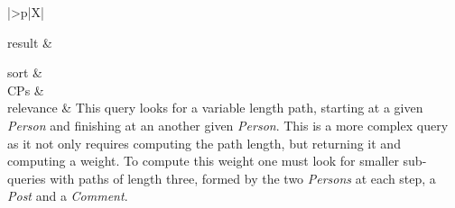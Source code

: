 \begin{tabularx}{\queryCardWidth}{|>{\queryPropertyCell}p{\queryPropertyCellWidth}|X|}
%
	
		result &
		\innerCardVSpace \\ \hline
	
%
	
		sort		&
		\innerCardVSpace \\ \hline
	CPs &
	 \\ \hline
	relevance &
		\footnotesize This query looks for a variable length path, starting at a given
\emph{Person} and finishing at an another given \emph{Person}. This is a
more complex query as it not only requires computing the path length,
but returning it and computing a weight. To compute this weight one must
look for smaller sub-queries with paths of length three, formed by the
two \emph{Persons} at each step, a \emph{Post} and a \emph{Comment}.
 \\ \hline%
\end{tabularx}
\queryCardVSpace

\let\emph\oldemph